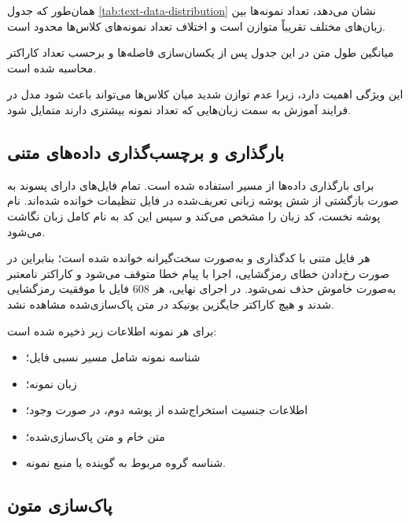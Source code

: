 \documentclass[12pt,a4paper,oneside]{report}
\begin{document}
همان‌طور که جدول \ref{tab:text-data-distribution} نشان می‌دهد، تعداد نمونه‌ها بین زبان‌های مختلف تقریباً متوازن است و اختلاف تعداد نمونه‌های کلاس‌ها محدود است.

میانگین طول متن در این جدول پس از یکسان‌سازی فاصله‌ها و برحسب تعداد کاراکتر محاسبه شده است.

این ویژگی اهمیت دارد، زیرا عدم توازن شدید میان کلاس‌ها می‌تواند باعث شود مدل در فرایند آموزش به سمت زبان‌هایی که تعداد نمونه بیشتری دارند متمایل شود.


\subsection{بارگذاری و برچسب‌گذاری داده‌های متنی}

برای بارگذاری داده‌ها از مسیر
استفاده شده است. تمام فایل‌های دارای پسوند
به صورت بازگشتی از شش پوشه زبانی تعریف‌شده در فایل تنظیمات خوانده شده‌اند. نام پوشه نخست، کد زبان را مشخص می‌کند و سپس این کد به نام کامل زبان نگاشت می‌شود.

هر فایل متنی با کدگذاری
و به‌صورت سخت‌گیرانه خوانده شده است؛ بنابراین در صورت رخ‌دادن خطای رمزگشایی، اجرا با پیام خطا متوقف می‌شود و کاراکتر نامعتبر به‌صورت خاموش حذف نمی‌شود. در اجرای نهایی، هر 608 فایل با موفقیت رمزگشایی شدند و هیچ کاراکتر جایگزین یونیکد در متن پاک‌سازی‌شده مشاهده نشد.

برای هر نمونه اطلاعات زیر ذخیره شده است:

\begin{itemize}

	\item شناسه نمونه شامل مسیر نسبی فایل؛

	\item زبان نمونه؛

	\item اطلاعات جنسیت استخراج‌شده از پوشه دوم، در صورت وجود؛

	\item متن خام و متن پاک‌سازی‌شده؛

	\item شناسه گروه مربوط به گوینده یا منبع نمونه.

\end{itemize}


\subsection{پاک‌سازی متون}
\end{document}
